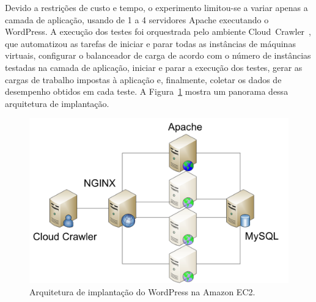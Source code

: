 \documentclass[10pt,conference,compsocconf]{IEEEtran}
\begin{document}
Devido a restrições de custo e tempo, o experimento limitou-se a variar 
apenas a camada de aplicação, usando de 1 a 4 servidores Apache executando o WordPress. 
A execução dos testes foi orquestrada pelo ambiente Cloud~Crawler~\cite{cunha2013b},
que automatizou as tarefas de iniciar e parar todas as instâncias de máquinas virtuais, configurar 
o balanceador de carga de acordo com o número de instâncias testadas na camada de 
aplicação, iniciar e parar a execução dos testes, gerar as cargas de trabalho impostas à aplicação e, finalmente, coletar os dados de desempenho obtidos em cada teste. A Figura~\ref{fig:implantacao} mostra um panorama dessa arquitetura de implantação.

\begin{figure}[t]
  \begin{center}
    \includegraphics[trim = 0mm 0mm 0mm 0mm, scale=0.35]{img/WordPress-deployment}
  \end{center}
  \caption{\label{fig:implantacao}Arquitetura de implantação do WordPress na Amazon EC2.}
\end{figure}
\end{document}
